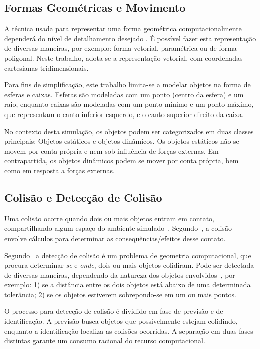 \documentclass[12pt]{article}
\begin{document}
\subsection{Formas Geométricas e Movimento}
A técnica usada para representar uma forma geométrica computacionalmente dependerá do nível de detalhamento desejado \cite{pharr2016}. É possível fazer esta representação de diversas maneiras, por exemplo: forma vetorial, paramétrica ou de forma poligonal. Neste trabalho, adota-se a representação vetorial, com coordenadas cartesianas tridimensionais.

Para fins de simplificação, este trabalho limita-se a modelar objetos na forma de esferas e caixas. Esferas são modeladas com um ponto (centro da esfera) e um raio, enquanto caixas são modeladas com um ponto mínimo e um ponto máximo, que representam o canto inferior esquerdo, e o canto superior direito da caixa.

No contexto desta simulação, os objetos podem ser categorizados em duas classes principais: Objetos estáticos e objetos dinâmicos. Os objetos estáticos não se movem por conta própria e nem sob influência de forças externas. Em contrapartida, os objetos dinâmicos podem se mover por conta própria, bem como em resposta a forças externas.

\subsection{Colisão e Detecção de Colisão}

Uma colisão ocorre quando dois ou mais objetos entram em contato, compartilhando algum espaço do ambiente simulado~\cite{ericson2004real}. Segundo~\cite{bourg2013physics}, a colisão envolve cálculos para determinar as consequências/efeitos desse contato.

Segundo~\cite{bourg2013physics} a detecção de colisão é um problema de geometria computacional, que procura determinar \emph{se} e \emph{onde}, dois ou mais objetos colidiram. Pode ser detectada de diversas maneiras, dependendo da natureza dos objetos envolvidos~\cite{foley1996}, por exemplo: 1) se a distância entre os dois objetos está abaixo de uma determinada tolerância; 2) se os objetos estiverem sobrepondo-se em um ou mais pontos.

O processo para detecção de colisão é dividido em fase de previsão e de identificação. A previsão busca objetos que possivelmente estejam colidindo, enquanto a identificação localiza as colisões ocorridas. A separação em duas fases distintas garante um consumo racional do recurso computacional. 
\end{document}
